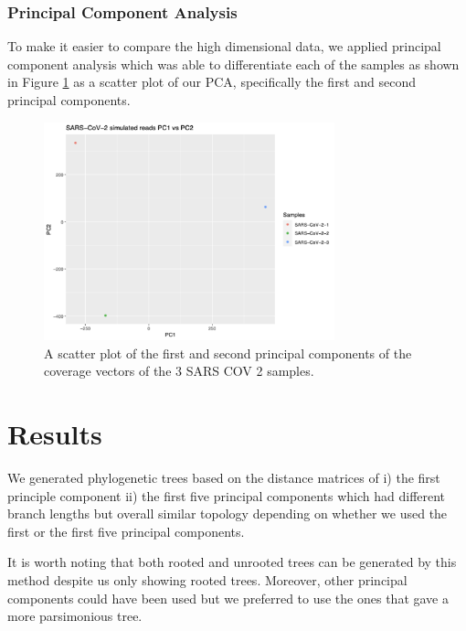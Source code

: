 \documentclass[10pt, a4paper]{article}
\begin{document}
\newpage
\subsubsection{Principal Component Analysis}
\label{sec:org87548f3}
To make it easier to compare the high dimensional data, we applied principal 
component analysis which was able to differentiate each of the samples as shown
in Figure \ref{fig:org42a605e} as a scatter plot of our PCA, specifically the first and 
second principal components.

\begin{figure}[h]
\centering
\includegraphics[width=0.75\textwidth]{../Figures/SARS_CoV_2/PCA.png}
\caption[SARS-CoV-2 PCA]{\label{fig:org42a605e}
A scatter plot of the first and second principal components of the coverage vectors of the 3 SARS COV 2 samples.}
\end{figure}

\clearpage
\section{Results}
\label{sec:orgab52320}
We generated phylogenetic trees based on the distance matrices of i) the first 
principle component ii) the first five principal components which had different 
branch lengths but overall similar topology depending on whether we used the 
first or the first five principal components. 

It is worth noting that both rooted and unrooted trees can be generated by this
method despite us only showing rooted trees. Moreover, other principal
components could have been used but we preferred to use the ones that gave a 
more parsimonious tree.

\end{document}

